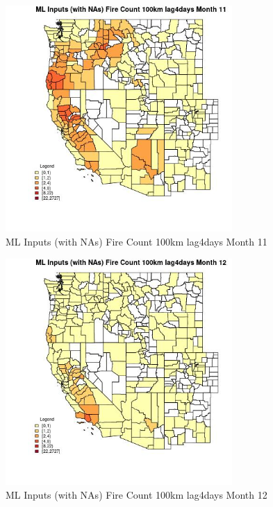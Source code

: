 \begin{figure} 
\centering  
\includegraphics[width=0.77\textwidth]{Code_Outputs/Report_ML_input_PM25_Step4_part_f_de_duplicated_aves_prioritize_24hr_obswNAs_CountyFire_Count_100km_lag4daysmedianMonth11.jpg} 
\caption{\label{fig:Report_ML_input_PM25_Step4_part_f_de_duplicated_aves_prioritize_24hr_obswNAsCountyFire_Count_100km_lag4daysmedianMonth11}ML Inputs (with NAs) Fire Count 100km lag4days Month 11} 
\end{figure} 
 

\begin{figure} 
\centering  
\includegraphics[width=0.77\textwidth]{Code_Outputs/Report_ML_input_PM25_Step4_part_f_de_duplicated_aves_prioritize_24hr_obswNAs_CountyFire_Count_100km_lag4daysmedianMonth12.jpg} 
\caption{\label{fig:Report_ML_input_PM25_Step4_part_f_de_duplicated_aves_prioritize_24hr_obswNAsCountyFire_Count_100km_lag4daysmedianMonth12}ML Inputs (with NAs) Fire Count 100km lag4days Month 12} 
\end{figure} 
 

